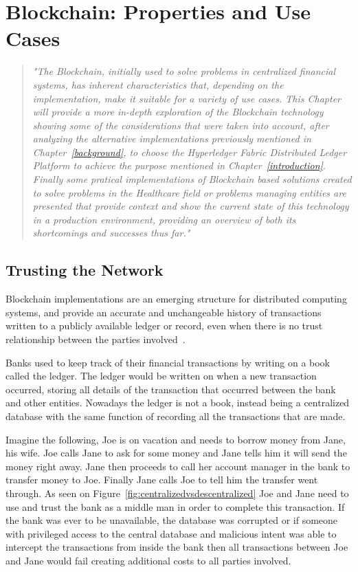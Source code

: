 \chapter{Blockchain: Properties and Use Cases}

\begin{quote} \emph{"The Blockchain, initially used to solve problems in
  centralized financial systems, has inherent characteristics that, depending
  on the implementation, make it suitable for a variety of use cases. This
  Chapter will provide a more in-depth exploration of the Blockchain technology
  showing some of the considerations that were taken into account, after
  analyzing the alternative implementations previously mentioned in
  Chapter~\ref{background}, to choose the Hyperledger Fabric Distributed Ledger
  Platform to achieve the purpose mentioned in Chapter~\ref{introduction}.
  Finally some pratical implementations of Blockchain based solutions created
  to solve problems in the Healthcare field or problems managing entities are
  presented that provide context and show the current state of this technology
  in a production environment, providing an overview of both its shortcomings
  and successes thus far."} \end{quote}

\section{Trusting the Network}

Blockchain implementations are an emerging structure for distributed computing
systems, and provide an accurate and unchangeable history of transactions
written to a publicly available ledger or record, even when there is no trust
relationship between the parties involved~\cite{Barclay2017}.

Banks used to keep track of their financial transactions by writing on a book
called the ledger. The ledger would be written on when a new transaction
occurred, storing all details of the transaction that occurred between the bank
and other entities. Nowadays the ledger is not a book, instead being a
centralized database with the same function of recording all the transactions
that are made.

Imagine the following, Joe is on vacation and needs to borrow money from Jane,
his wife. Joe calls Jane to ask for some money and Jane tells him it will send
the money right away. Jane then proceeds to call her account manager in the
bank to transfer money to Joe. Finally Jane calls Joe to tell him the transfer
went through.  As seen on Figure~\ref{fig:centralizedvsdescentralized} Joe and
Jane need to use and trust the bank as a middle man in order to complete this
transaction. If the bank was ever to be unavailable, the database was corrupted
or if someone with  privileged access to the central database and malicious
intent was able to intercept the transactions from inside the bank then all
transactions between Joe and Jane would fail creating additional costs to all
parties involved. 

